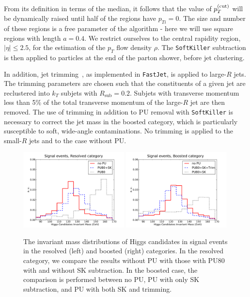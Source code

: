 From its definition in terms of the median,
it follows that the value of $p_T^{(\rm cut)}$
will be dynamically raised until half of the regions have
$p_{Ti}=0$.
%
The size and number of these regions is a free parameter of the algorithm -
here we will use square regions with length $a=0.4$.
%
We restrict ourselves to the central rapidity region,
$|\eta| \le 2.5$, for the estimation of the
$p_T$ flow density $\rho$.
%
The {\tt SoftKiller} subtraction is then
applied to particles at the end of the parton shower, before
jet clustering.

In addition, jet trimming~\cite{Krohn:2009th}, as implemented in {\tt FastJet}, is applied to large-$R$ jets.
%
The trimming parameters are chosen such that the constituents of a given jet are reclustered into $k_T$ subjets with $R_{\textrm{sub}} = 0.2$.
Subjets with transverse momentum less than 5\% of the total
transverse momentum of the large-$R$ jet are then removed.
%
The use of trimming in addition to PU removal with {\tt SoftKiller} is necessary to correct the jet mass in the boosted category,
which is particularly susceptible
to soft, wide-angle contaminations.
%
No trimming is applied to the small-$R$ jets and
to the case without PU.


\begin{figure}[t]
  \begin{center}
    \includegraphics[width=0.49\textwidth]{plots/m_htot_res_signal_PUnoSK.pdf}
    \includegraphics[width=0.49\textwidth]{plots/m_htot_bst_signal_PUnoTrim.pdf}
    \caption{\small
    The invariant mass distributions of Higgs candidates in signal
    events in the resolved (left) and boosted
    (right) categories.
    In the resolved category,
    we compare  the results without PU
    with those with PU80
    with and without SK subtraction.
    In the boosted case, the comparison is performed between no PU,
    PU with only SK subtraction,
    and PU with both SK and trimming.
}
\label{fig:PUvalidation}
\end{center}
\end{figure}

